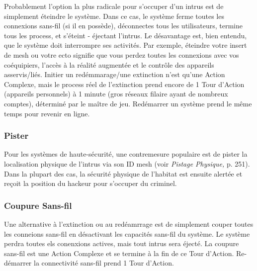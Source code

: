 Probablement l'option la plus radicale pour s'occuper d'un intrus est de simplement éteindre le système. Dans ce cas, le système ferme toutes les connexions sans-fil (si il en possède), déconnectes tous les utilisateurs, termine tous les process, et s'éteint - éjectant l'intrus. Le désavantage est, bien entendu, que le système doit interrompre ses activités. Par exemple, éteindre votre insert de mesh ou votre ecto signifie que vous perdez toutes les connexions avec vos coéquipiers, l'accès à la réalité augmentée et le contrôle des appareils asservis/liés. Initier un redémmarage/une extinction n'est qu'une Action Complexe, mais le process réel de l'extinction prend encore de 1 Tour d'Action (appareils personnels) à 1 minute (gros réseaux filaire ayant de nombreux comptes), déterminé par le maître de jeu. Redémarrer un système prend le même temps pour revenir en ligne. 



\subsubsection{Pister} 

Pour les systèmes de haute-sécurité, une contremesure populaire est de pister la localisation physique de l'intrus via son ID mesh (voir \textit{Pistage Physique,} p. 251). Dans la plupart des cas, la sécurité physique de l'habitat est ensuite alertée et reçoit la position du hackeur pour s'occuper du criminel. 

\subsubsection{Coupure Sans-fil} 

Une alternative à l'extinction ou au redéamrrage est de simplement couper toutes les conneions sans-fil en désactivant les capacités sans-fil du système. Le système perdra toutes els conenxions actives, mais tout intrus sera éjecté. La coupure sans-fil est une Action Complexe et se termine à la fin de ce Tour d'Action. Re-démarrer la connectivité sans-fil prend 1 Tour d'Action. 



